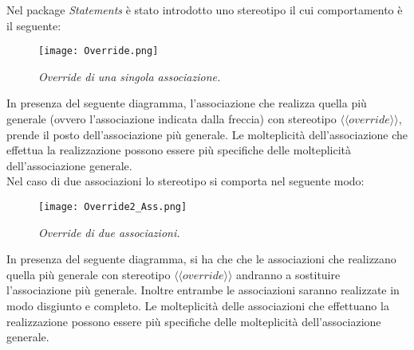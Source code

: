 
Nel package \textit{Statements} è stato introdotto uno stereotipo il cui comportamento è il seguente:
\begin{figure}[H]
	\centering
	\texttt{[image: Override.png]}
	\caption{\small{\textit{Override di una singola associazione.}}}
\end{figure}
\noindent In presenza del seguente diagramma, l'associazione che realizza quella più generale (ovvero l'associazione indicata dalla freccia) con stereotipo $\langle\langle override \rangle\rangle$, prende il posto dell'associazione più generale. Le molteplicità dell'associazione che effettua la realizzazione possono essere più specifiche delle molteplicità dell'associazione generale. \\
Nel caso di due associazioni lo stereotipo si comporta nel seguente modo:
\begin{figure}[H]
	\centering
	\texttt{[image: Override2\_Ass.png]}
	\caption{\small{\textit{Override di due associazioni.}}}
\end{figure}
\noindent In presenza del seguente diagramma, si ha che che le associazioni che realizzano quella più generale con stereotipo $\langle\langle override \rangle\rangle$ andranno a sostituire l'associazione più generale. Inoltre entrambe le associazioni saranno realizzate in modo disgiunto e completo. Le molteplicità delle associazioni che effettuano la realizzazione possono essere più specifiche delle molteplicità dell'associazione generale.